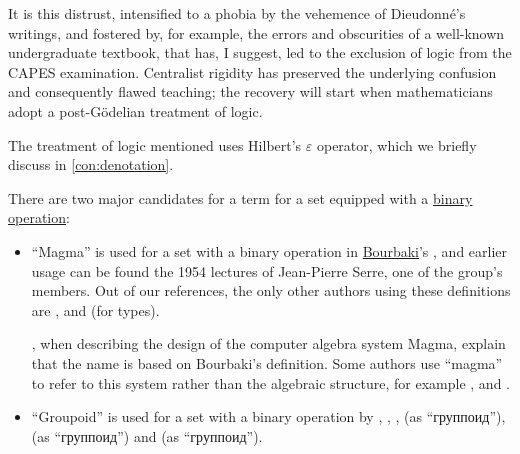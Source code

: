\begin{remark}
\begin{displayquote}
    It is this distrust, intensified to a phobia by the vehemence of Dieudonn\'e's writings, and fostered by, for example, the errors and obscurities of a well-known undergraduate textbook, that has, I suggest, led to the exclusion of logic from the CAPES examination. Centralist rigidity has preserved the underlying confusion and consequently flawed teaching; the recovery will start when mathematicians adopt a post-G\"odelian treatment of logic.
  \end{displayquote}

  The treatment of logic mentioned uses Hilbert's \( \varepsilon \) operator, which we briefly discuss in \cref{con:denotation}.
\end{remark}

\begin{remark}\label{rem:magma_terminology}
  There are two major candidates for a term for a set equipped with a \hyperref[def:binary_operation]{binary operation}:
  \begin{itemize}
    \item \enquote{Magma} is used for a set with a binary operation in \hyperref[rem:bourbaki]{Bourbaki}'s \cite[def. A I.1]{Bourbaki1970Algèbre1à3}, and earlier usage can be found the 1954 lectures \cite[18]{Serre1992LieGroups} of Jean-Pierre Serre, one of the group's members. Out of our references, the only other authors using these definitions are ,  and  (for types).

    , when describing the design of the computer algebra system Magma, explain that the name is based on Bourbaki's definition. Some authors use \enquote{magma} to refer to this system rather than the algebraic structure, for example ,  and .

    \item \enquote{Groupoid} is used for a set with a binary operation by
    ,
    ,
    ,
     (as \enquote{группоид}),
     (as \enquote{группоид}) and
     (as \enquote{группоид}).


\end{itemize}
\end{remark}

